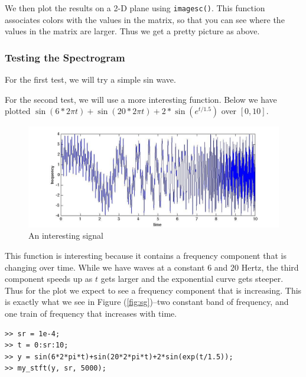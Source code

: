 \documentclass{article}
\begin{document}
We then plot the results on a 2-D plane using {\tt imagesc()}.  This function associates colors with the values in the matrix, so that you can see where the values in the matrix are larger.  Thus we get a pretty picture as above.

\subsubsection{Testing the Spectrogram}
For the first test, we will try a simple sin wave.  

For the second test, we will use a more interesting function.  Below we have plotted $\sin(6*2\pi t)+\sin(20*2\pi t)+2*\sin(e^{t/1.5})$ over $[0,10]$.

\begin{figure}[htbp]
\begin{center}
\includegraphics[scale=0.45]{sg_sig.jpg}
\caption{An interesting signal}
\label{default}
\end{center}
\end{figure}
This function is interesting because it contains a frequency component that is changing over time.  While we have waves at a constant $6$ and $20$ Hertz, the third component speeds up as $t$ gets larger and the exponential curve gets steeper.  Thus for the plot we expect to see a frequency component that is increasing.  This is exactly what we see in Figure (\ref{fig:sg})--two constant band of frequency, and one train of frequency that increases with time.

\begin{verbatim}
>> sr = 1e-4;
>> t = 0:sr:10;
>> y = sin(6*2*pi*t)+sin(20*2*pi*t)+2*sin(exp(t/1.5));
>> my_stft(y, sr, 5000);
\end{verbatim}
\end{document}
